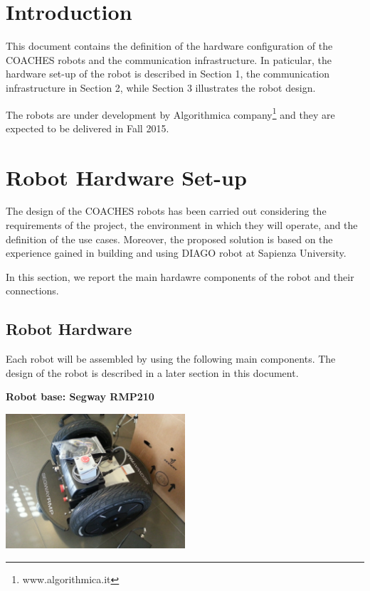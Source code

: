 \section*{Introduction}

This document contains the definition of the hardware configuration of the COACHES robots and the communication infrastructure. In paticular, the hardware set-up of the robot is described in Section 1, the communication infrastructure in Section 2, while Section 3 illustrates the robot design.

The robots are under development by Algorithmica company\footnote{www.algorithmica.it} and they are expected to be delivered in Fall 2015.


\section{Robot Hardware Set-up}

The design of the COACHES robots has been carried out considering the requirements of the project, the environment in which they will operate, and the definition of the use cases.
Moreover, the proposed solution is based on the experience gained in building and using DIAGO robot at Sapienza University.

In this section, we report the main hardawre components of the robot and their connections.


\subsection{Robot Hardware}

Each robot will be assembled by using the following main components.
The design of the robot is described in a later section in this document.


{\bf Robot base: Segway RMP210}

\begin{center}
\includegraphics[height=5cm]{fig/segway_rmp210.jpg}
\end{center}

